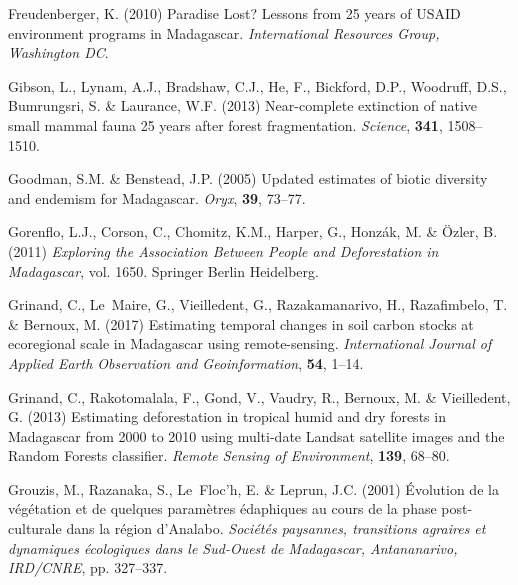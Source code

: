 \documentclass[a4paper, 12pt, leqno]{article} %
\begin{document}
\begin{thebibliography}{55}
Freudenberger, K. (2010) {Paradise Lost? Lessons from 25 years of USAID
  environment programs in Madagascar}.
\newblock \emph{International Resources Group, Washington DC}.

Gibson, L., Lynam, A.J., Bradshaw, C.J., He, F., Bickford, D.P., Woodruff,
  D.S., Bumrungsri, S. \& Laurance, W.F. (2013) Near-complete extinction of
  native small mammal fauna 25 years after forest fragmentation.
\newblock \emph{Science}, \textbf{341}, 1508--1510.

Goodman, S.M. \& Benstead, J.P. (2005) {Updated estimates of biotic diversity
  and endemism for Madagascar}.
\newblock \emph{Oryx}, \textbf{39}, 73--77.

Gorenflo, L.J., Corson, C., Chomitz, K.M., Harper, G., Honzák, M. \&
  {\"O}zler, B. (2011) \emph{{Exploring the Association Between People and
  Deforestation in Madagascar}}, vol. 1650.
\newblock Springer Berlin Heidelberg.

Grinand, C., Le~Maire, G., Vieilledent, G., Razakamanarivo, H., Razafimbelo, T.
  \& Bernoux, M. (2017) {Estimating temporal changes in soil carbon stocks at
  ecoregional scale in Madagascar using remote-sensing}.
\newblock \emph{International Journal of Applied Earth Observation and
  Geoinformation}, \textbf{54}, 1--14.

Grinand, C., Rakotomalala, F., Gond, V., Vaudry, R., Bernoux, M. \&
  Vieilledent, G. (2013) {Estimating deforestation in tropical humid and dry
  forests in Madagascar from 2000 to 2010 using multi-date Landsat satellite
  images and the Random Forests classifier}.
\newblock \emph{Remote Sensing of Environment}, \textbf{139}, 68--80.

Grouzis, M., Razanaka, S., Le~Floc’h, E. \& Leprun, J.C. (2001)
  {{\'E}volution de la v{\'e}g{\'e}tation et de quelques param{\`e}tres
  {\'e}daphiques au cours de la phase post-culturale dans la r{\'e}gion
  d’Analabo}.
\newblock \emph{Soci{\'e}t{\'e}s paysannes, transitions agraires et dynamiques
  {\'e}cologiques dans le Sud-Ouest de Madagascar, Antananarivo, IRD/CNRE}, pp.
  327--337.


\end{thebibliography}
\end{document}
